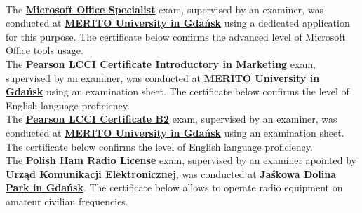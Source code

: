 \begin{rightcolumn}
        \vspace{\itemspace}\\
            {The \href{https://support.microsoft.com/en-us/topic/earn-a-microsoft-office-specialist-mos-certification-0885c944-167c-51ea-1cdc-8f65952bd1b8}{\textbf{Microsoft Office Specialist}} exam, supervised by an examiner, was conducted at \href{https://www.merito.pl/english/gdansk/}{\textbf{MERITO University in Gdańsk}} using a dedicated application for this purpose. The certificate below confirms the advanced level of Microsoft Office tools usage.}
        \vspace{\itemspace}\\
            {The \href{https://drive.google.com/file/d/1vBCEezspA7uQ0AJuSDX23JJqBxelfT__/view}{\textbf{Pearson LCCI Certificate Introductory in Marketing}} exam, supervised by an examiner, was conducted at \href{https://www.merito.pl/english/gdansk/}{\textbf{MERITO University in Gdańsk}} using an examination sheet. The certificate below confirms the level of English language proficiency.}
        \vspace{\itemspace}\\
            {The \href{https://drive.google.com/file/d/13rLS1UrRYQnpc4gBlC56gpBl9o_awkVq/view}{\textbf{Pearson LCCI Certificate B2}} exam, supervised by an examiner, was conducted at \href{https://www.merito.pl/english/gdansk/}{\textbf{MERITO University in Gdańsk}} using an examination sheet. The certificate below confirms the level of English language proficiency.}
        \vspace{\itemspace}\\
            {The \href{https://www.dziennikustaw.gov.pl/D2015000001001.pdf}{\textbf{Polish Ham Radio License}} exam, supervised by an examiner apointed by \href{https://www.uke.gov.pl/}{\textbf{Urząd Komunikacji Elektronicznej}}, was conducted at \href{https://infogdansk.pl/park-jaskowej-doliny/}{\textbf{Jaśkowa Dolina Park in Gdańsk}}. The certificate below allows to operate radio equipment on amateur civilian frequencies.}
    \end{rightcolumn} %
